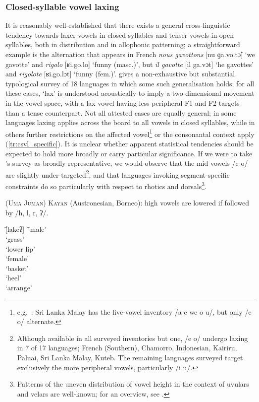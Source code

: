 \subsubsection{Closed-syllable vowel laxing}\label{sss:csvl}

It is reasonably well-established that there exists a general cross-linguistic tendency towards laxer vowels in closed syllables and tenser vowels in open syllables, both in distribution and in allophonic patterning; a straightforward example is the alternation that appears in French \emph{nous gavottons} [nu ɡa.vo.tɔ̃] `we gavotte' and \emph{rigolo} [ʁi.go.lo] `funny (masc.)', but \emph{il gavotte} [il ga.vɔt] `he gavottes' and \emph{rigolote} [ʁi.go.lɔt] `funny (fem.)'. \citet[p.~223–226]{Storme2017PhD} gives a non-exhaustive but substantial typological survey of 18 languages in which some such generalisation holds; for all these cases, `lax' is understood acoustically to imply a two-dimensional movement in the vowel space, with a lax vowel having less peripheral F1 and F2 targets than a tense counterpart. Not all attested cases are equally general; in some languages laxing applies across the board to all vowels in closed syllables, while in others further restrictions on the affected vowel\footnote{e.g.~\citet{Nordhoff2009}: Sri Lanka Malay has the five-vowel inventory /a e we o u/, but only /e o/ alternate.} or the consonantal context apply (\cref{tr:csvl_specific}). It is unclear whether apparent statistical tendencies should be expected to hold more broadly or carry particular significance. If we were to take \citeauthor{Storme2017PhD}'s survey as broadly representative, we would observe that the mid vowels /e o/ are slightly under-targeted\footnote{Although available in all surveyed inventories but one, /e o/ undergo laxing in 7 of 17 languages; French (Southern), Chamorro, Indonesian, Kairiru, Paluai, Sri Lanka Malay, Kuteb. The remaining languages surveyed target exclusively the more peripheral vowels, particularly /i u/.}, and that languages invoking segment-specific constraints do so particularly with respect to rhotics and dorsals\footnote{Patterns of the uneven distribution of vowel height in the context of uvulars and velars are well-known; for an overview, see \citet[p.~103]{Gallagher2016}.}.

\begin{example} \label{tr:csvl_specific}
  \textsc{(Uma Juman) Kayan} (Austronesian, Borneo): high vowels are lowered if followed by /h, l, r, ʔ/. \citep[p.~263]{Blust2013}
  \begin{tabbing}
   \tab[2cm] \= [lakeʔ] \tab[2cm] \= `male'\\
   \> [uroʔ] \> `grass'\\
    \> `lower lip'\\
   \> [doh] \> `female'\\
    \> `basket'\\
    \> `heel'\\
   \> [ˈ{ʔ}a.toɾ] \> `arrange'
    \end{tabbing}
\end{example}


